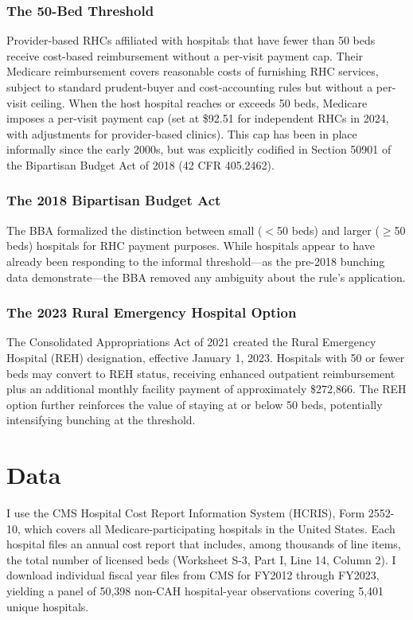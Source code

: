 \documentclass[12pt]{article}
\begin{document}
\subsubsection*{The 50-Bed Threshold} Provider-based RHCs affiliated with hospitals that have fewer than 50 beds receive cost-based reimbursement without a per-visit payment cap. Their Medicare reimbursement covers reasonable costs of furnishing RHC services, subject to standard prudent-buyer and cost-accounting rules but without a per-visit ceiling. When the host hospital reaches or exceeds 50 beds, Medicare imposes a per-visit payment cap (set at \$92.51 for independent RHCs in 2024, with adjustments for provider-based clinics). This cap has been in place informally since the early 2000s, but was explicitly codified in Section 50901 of the Bipartisan Budget Act of 2018 (42 CFR 405.2462).

\subsubsection*{The 2018 Bipartisan Budget Act} The BBA formalized the distinction between small ($<$50 beds) and larger ($\geq$50 beds) hospitals for RHC payment purposes. While hospitals appear to have already been responding to the informal threshold---as the pre-2018 bunching data demonstrate---the BBA removed any ambiguity about the rule's application.

\subsubsection*{The 2023 Rural Emergency Hospital Option} The Consolidated Appropriations Act of 2021 created the Rural Emergency Hospital (REH) designation, effective January 1, 2023. Hospitals with 50 or fewer beds may convert to REH status, receiving enhanced outpatient reimbursement plus an additional monthly facility payment of approximately \$272,866. The REH option further reinforces the value of staying at or below 50 beds, potentially intensifying bunching at the threshold.

\section{Data}\label{sec:data}

I use the CMS Hospital Cost Report Information System (HCRIS), Form 2552-10, which covers all Medicare-participating hospitals in the United States. Each hospital files an annual cost report that includes, among thousands of line items, the total number of licensed beds (Worksheet S-3, Part I, Line 14, Column 2). I download individual fiscal year files from CMS for FY2012 through FY2023, yielding a panel of 50,398 non-CAH hospital-year observations covering 5,401 unique hospitals.
\end{document}
